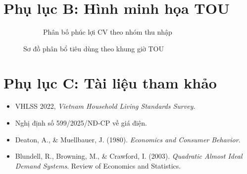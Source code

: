 \documentclass[12pt,a4paper]{article}
\begin{document}
	\section{Phụ lục B: Hình minh họa TOU}
	\begin{figure}[H]
		\centering
		\begin{figure}[H]
			\centering
			\caption{Phân bố phúc lợi CV theo nhóm thu nhập}
		\end{figure}
		\caption{Sơ đồ phân bổ tiêu dùng theo khung giờ TOU}
	\end{figure}
	
	\section{Phụ lục C: Tài liệu tham khảo}
	\begin{itemize}
		\item VHLSS 2022, \textit{Vietnam Household Living Standards Survey}.
		\item Nghị định số 599/2025/NĐ-CP về giá điện.
		\item Deaton, A., \& Muellbauer, J. (1980). \textit{Economics and Consumer Behavior}.
		\item Blundell, R., Browning, M., \& Crawford, I. (2003). \textit{Quadratic Almost Ideal Demand Systems}. Review of Economics and Statistics.
	\end{itemize}
	
\end{document}
